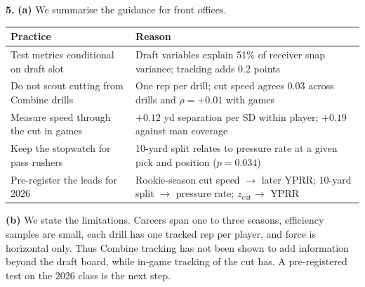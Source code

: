 \documentclass[11pt]{article}
\begin{document}
\noindent\textbf{5.}
\noindent\textbf{(a)}
We summarise the guidance for front offices.

\begin{center}
\small
\setlength{\tabcolsep}{4pt}
\begin{tabular}{p{}p{}}
\toprule
\textbf{Practice} & \textbf{Reason} \\
\midrule
Test metrics conditional on draft slot & Draft variables explain 51\% of receiver snap variance; tracking adds 0.2 points \\
Do not scout cutting from Combine drills & One rep per drill; cut speed agrees 0.03 across drills and $\rho = +0.01$ with games \\
Measure speed through the cut in games & $+0.12$ yd separation per SD within player; $+0.19$ against man coverage \\
Keep the stopwatch for pass rushers & 10-yard split relates to pressure rate at a given pick and position ($p = 0.034$) \\
Pre-register the leads for 2026 & Rookie-season cut speed $\to$ later YPRR; 10-yard split $\to$ pressure rate; $z_{\text{cut}} \to$ YPRR \\
\bottomrule
\end{tabular}
\end{center}

\noindent\textbf{(b)}
We state the limitations. Careers span one to three seasons, efficiency samples are small, each drill has one tracked rep per player, and force is horizontal only. Thus Combine tracking has not been shown to add information beyond the draft board, while in-game tracking of the cut has. A pre-registered test on the 2026 class is the next step.
\end{document}
